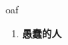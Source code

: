 
\begin{frame}
{\huge oaf}
\begin{center}
\begin{enumerate}\Large
  \item \textbf{愚蠢的人}
\end{enumerate}
\end{center}
\end{frame}
